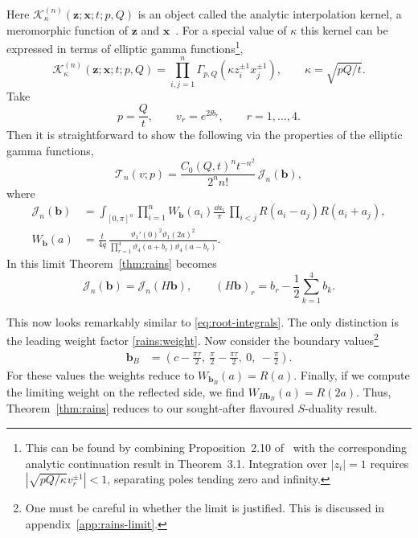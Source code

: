 Here $\mathcal K_\kappa^{(n)}(\mathbf{z};\mathbf{x};t;p,Q)$ is an object called
the analytic interpolation kernel, a meromorphic function of
$\mathbf{z}$ and $\mathbf{x}$~\cite[Theorem~3.1]{Rains:2018kernel}.
For a special value of $\kappa$ this kernel can be expressed in terms of
elliptic gamma functions\footnote{\label{rains:contour}This can be found by
  combining Proposition~2.10 of~\cite{Rains:2018kernel} with the corresponding
  analytic continuation result in Theorem~3.1. Integration over $|z_i|=1$
  requires $\left|\sqrt{pQ/\kappa}v_r^{\pm1}\right|<1$, separating poles
  tending zero and infinity.},
\begin{equation}
  \mathcal K_\kappa^{(n)}(\mathbf{z};\mathbf{x};t;p,Q)
  =\prod_{i,j=1}^n\Gamma_{p,Q}(\kappa z_i^{\pm1}x_j^{\pm1}),
  \qquad \kappa=\sqrt{pQ/t}.
  \label{rains:kernel-product}
\end{equation}
Take
\begin{equation}
  p=\frac Qt,\qquad
  v_r=e^{2\ii b_r},\qquad r=1,\ldots,4.
  \label{rains:dictionary}
\end{equation}
Then it is straightforward to show the following via the properties of the
elliptic gamma functions,
\begin{equation}
  \mathcal T_n(v;p)
  =\frac{C_0(Q,t)^n t^{-n^2}}{2^n n!}\,
  \mathcal J_n(\mathbf{b}),
  \label{rains:normalization}
\end{equation}
where
\begin{align}
  \mathcal J_n(\mathbf{b})
  &=\int_{[0,\pi]^n}\prod_{i=1}^n
  W_{\mathbf{b}}(a_i)\frac{\dd a_i}{\pi}\,
  \prod_{i<j}R(a_i-a_j)R(a_i+a_j),
  \label{rains:theta-integral}\\
  W_{\mathbf{b}}(a)
  &=\frac{t}{4q}\,
  \frac{\vartheta_1'(0)^2\vartheta_1(2a)^2}
  {\displaystyle\prod_{r=1}^4
    \vartheta_4(a+b_r)\vartheta_4(a-b_r)}.
  \label{rains:weight}
\end{align}
In this limit Theorem~\ref{thm:rains} becomes
\begin{equation}
  \mathcal J_n(\mathbf{b})=\mathcal J_n(H\mathbf{b}),
  \qquad (H\mathbf{b})_r=b_r-\frac12\sum_{k=1}^4b_k.
  \label{rains:theta-identity}
\end{equation}

This now looks remarkably similar to \eqref{eq:root-integrals}. The only
distinction is the leading weight factor \eqref{rains:weight}. Now consider
the boundary values\footnote{One must be careful in whether the limit is
justified. This is discussed in appendix~\ref{app:rains-limit}.}
\begin{equation}
  \begin{aligned}
    \mathbf{b}_B
    &=\left(c-\frac{\pi\tau}{2},\
    \frac{\pi}{2}-\frac{\pi\tau}{2},\ 0,\ -\frac{\pi}{2}\right).
  \end{aligned}
  \label{rains:additive-BC}
\end{equation}
For these values the weights reduce to $W_{\mathbf{b}_B}(a)=R(a)$. Finally, if
we compute the limiting weight on the reflected side, we find
$W_{H\mathbf{b}_B}(a)=R(2a)$. Thus, Theorem~\ref{thm:rains} reduces to our
sought-after flavoured $S$-duality result.
